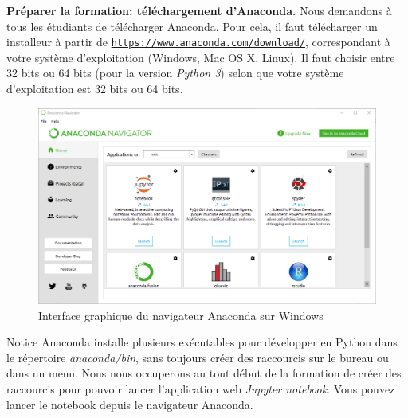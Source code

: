 \documentclass{beamer}
\begin{document}
\begin{frame}

\noindent\textbf{Préparer la formation: téléchargement d’Anaconda.}
Nous demandons à tous les étudiants de télécharger Anaconda. Pour cela, il faut télécharger un installeur à partir de \href{{https://www.anaconda.com/download/}}{\nolinkurl{https://www.anaconda.com/download/}}, correspondant à votre système d’exploitation (Windows, Mac OS X, Linux). Il faut choisir entre 32 bits ou 64 bits (pour la version \emph{Python 3}) selon que votre système d’exploitation est 32 bits ou 64 bits.
\end{frame}

\begin{frame}

\begin{figure}[!ht]  %
  \centerline{\includegraphics[width=0.7\linewidth]{figs/AnacondaNavigator.png}}
  \caption{
  Interface graphique du navigateur Anaconda sur Windows
  }
\end{figure}
\end{frame}

\begin{frame}

\begin{block}{Notice}
Anaconda installe plusieurs exécutables pour développer en Python dans le répertoire \emph{anaconda/bin}, sans toujours créer des raccourcis sur le bureau ou dans un menu. Nous nous occuperons au tout début de la formation de créer des raccourcis pour pouvoir lancer l'application web \emph{Jupyter notebook}. Vous pouvez lancer le notebook depuis le navigateur Anaconda.
\end{block}
\end{frame}
\end{document}
